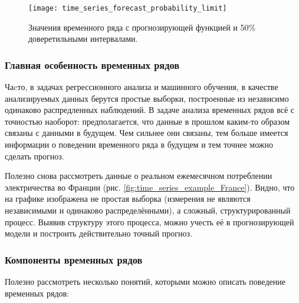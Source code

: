\begin{figure}[h!]
    \centering
    \texttt{[image: time\_series\_forecast\_probability\_limit]}
    \caption{Значения временного ряда с прогнозирующей функцией и 50\% доверетильными интервалами.}
    \label{fig:time_series_forecast_probability_limit}
\end{figure}

\subsubsection{Главная особенность временных рядов}

Чаcто, в задачах регрессионного анализа и машинного обучения, в качестве анализируемых 
данных берутся простые выборки, построенные из независимо одинаково распредленных 
наблюдений. В задаче анализа временных рядов всё с точностью наоборот: 
предполагается, что данные в прошлом каким-то образом связаны с данными в будущем. 
Чем сильнее они связаны, тем больше имеется информации о поведении временного ряда 
в будущем и тем точнее можно сделать прогноз. 

Полезно снова рассмотреть данные о реальном ежемесячном потреблении электричества во Франции 
(рис. \ref{fig:time_series_example_France}). Видно, что на графике изображена не простая 
выборка (измерения не являются независимыми и одинаково распределёнными), а сложный, 
структурированный процесс. Выявив структуру этого процесса, можно учесть её в
прогнозирующей модели и построить действительно точный прогноз.

\subsubsection{Компоненты временных рядов}

Полезно рассмотреть несколько понятий, которыми можно описать поведение временных рядов:

